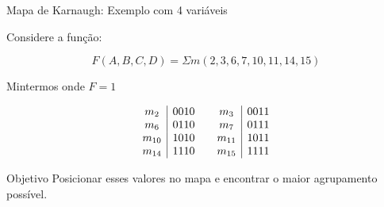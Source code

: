 \begin{frame}{Mapa de Karnaugh: Exemplo com 4 variáveis}
    \small

    Considere a função:

    \[
        F(A,B,C,D)
        =
        \Sigma m(2,3,6,7,10,11,14,15)
    \]

    \begin{block}{Mintermos onde $F=1$}

        \[
        \begin{array}{c|c@{\qquad}c|c}
            m_2 & 0010 & m_3 & 0011 \\
            m_6 & 0110 & m_7 & 0111 \\
            m_{10} & 1010 & m_{11} & 1011 \\
            m_{14} & 1110 & m_{15} & 1111
        \end{array}
        \]

    \end{block}

    \begin{alertblock}{Objetivo}
        Posicionar esses valores no mapa e encontrar
        o maior agrupamento possível.
    \end{alertblock}

\end{frame}